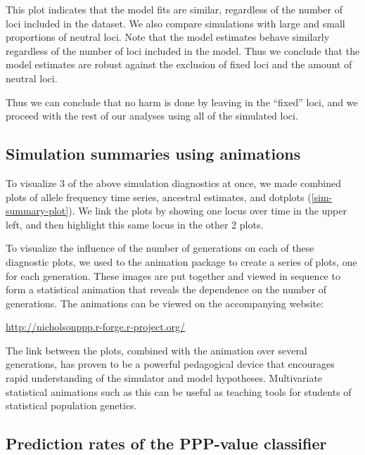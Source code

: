 \documentclass[a4paper,12pt]{article}
\begin{document}
This plot indicates that the model fits are similar, regardless of the
number of loci included in the dataset. We also compare simulations
with large and small proportions of neutral loci. Note that the model
estimates behave similarly regardless of the number of loci included
in the model. Thus we conclude that the model estimates are robust
against the exclusion of fixed loci and the amount of neutral loci.

Thus we can conclude that no harm is done by leaving in the ``fixed''
loci, and we proceed with the rest of our analyses using all of the
simulated loci.

\subsection{Simulation summaries using animations}

To visualize 3 of the above simulation diagnostics at once, we made
combined plots of allele frequency time series, ancestral estimates,
and dotplots (\autoref{sim-summary-plot}). We link the plots by
showing one locus over time in the upper left, and then highlight this
same locus in the other 2 plots.


To visualize the influence of the number of generations on each of
these diagnostic plots, we used to the animation
package \cite{animation} to create a series of plots, one for each
generation. These images are put together and viewed in sequence to
form a statistical animation that reveals the dependence on the number
of generations. The animations can be viewed on the accompanying
website:

\url{http://nicholsonppp.r-forge.r-project.org/}

The link between the plots, combined with the animation over several
generations, has proven to be a powerful pedagogical device that
encourages rapid understanding of the simulator and model
hypotheses. Multivariate statistical animations such as this can be
useful as teaching tools for students of statistical population
genetics.

\subsection{Prediction rates of the PPP-value classifier}
\end{document}

